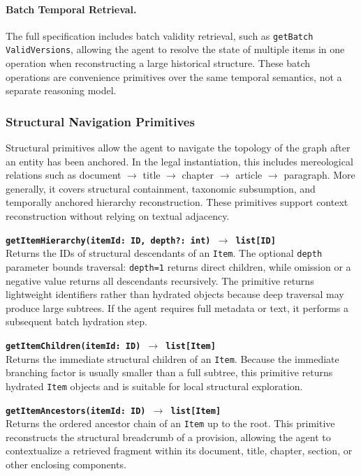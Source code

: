 \documentclass[11pt]{article}
\begin{document}
\paragraph{Batch Temporal Retrieval.}
The full specification includes batch validity retrieval, such as \texttt{getBatch ValidVersions}, allowing the agent to resolve the state of multiple items in one operation when reconstructing a large historical structure. These batch operations are convenience primitives over the same temporal semantics, not a separate reasoning model.

\subsubsection{Structural Navigation Primitives}
\label{subsubsec:structural_navigation}

Structural primitives allow the agent to navigate the topology of the graph after an entity has been anchored. In the legal instantiation, this includes mereological relations such as document $\rightarrow$ title $\rightarrow$ chapter $\rightarrow$ article $\rightarrow$ paragraph. More generally, it covers structural containment, taxonomic subsumption, and temporally anchored hierarchy reconstruction. These primitives support context reconstruction without relying on textual adjacency.

\vspace{0.3cm}
\noindent\textbf{\texttt{getItemHierarchy(itemId: ID, depth?: int) $\rightarrow$ list[ID]}}\\
Returns the IDs of structural descendants of an \texttt{Item}. The optional \texttt{depth} parameter bounds traversal: \texttt{depth=1} returns direct children, while omission or a negative value returns all descendants recursively. The primitive returns lightweight identifiers rather than hydrated objects because deep traversal may produce large subtrees. If the agent requires full metadata or text, it performs a subsequent batch hydration step.

\vspace{0.3cm}
\noindent\textbf{\texttt{getItemChildren(itemId: ID) $\rightarrow$ list[Item]}}\\
Returns the immediate structural children of an \texttt{Item}. Because the immediate branching factor is usually smaller than a full subtree, this primitive returns hydrated \texttt{Item} objects and is suitable for local structural exploration.

\vspace{0.3cm}
\noindent\textbf{\texttt{getItemAncestors(itemId: ID) $\rightarrow$ list[Item]}}\\
Returns the ordered ancestor chain of an \texttt{Item} up to the root. This primitive reconstructs the structural breadcrumb of a provision, allowing the agent to contextualize a retrieved fragment within its document, title, chapter, section, or other enclosing components.
\end{document}
